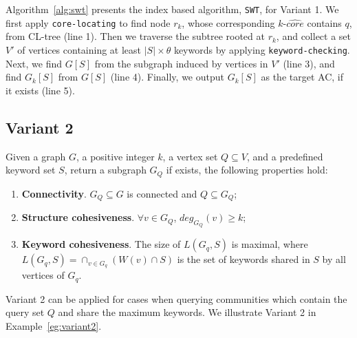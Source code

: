 Algorithm~\ref{alg:swt} presents the index based algorithm, {\tt SWT}, for Variant 1.
We first apply {\tt core-locating} to find node $r_k$, whose corresponding $k$-$\widehat {core}$ contains $q$, from CL-tree (line 1).
Then we traverse the subtree rooted at $r_k$, and collect a set $V'$ of vertices containing at least $|S|\times \theta$ keywords by applying {\tt keyword-checking}.
Next, we find $G[S]$ from the subgraph induced by vertices in $V'$ (line 3),
and find $G_k[S]$ from $G[S]$ (line 4).
Finally, we output $G_k[S]$ as the target AC, if it exists (line 5).




\subsection{Variant 2}
\begin{definition}
Given a graph $G$, a positive integer $k$, a vertex set $Q \subseteq V$, and a predefined keyword set $S$, return a subgraph $G_Q$ if exists, the following properties hold:
  \begin{enumerate}
    \item \textbf{Connectivity}. $G_Q \subseteq G$ is connected and $Q \subseteq G_Q$;
    \item \textbf{Structure cohesiveness}. $\forall v\in G_Q$, $deg_{G_Q}(v)\geq k$;
    \item \textbf{Keyword cohesiveness}. The size of $L(G_q, S)$ is maximal, where $L(G_q, S)=\cap_{v \in G_q}(W(v)\cap S)$ is the set of keywords shared in $S$ by all vertices of $G_q$.
  \end{enumerate}
\end{definition}

Variant 2 can be applied for cases when querying communities which contain the query set $Q$ and share the maximum keywords.
We illustrate Variant 2 in Example~\ref{eg:variant2}.

